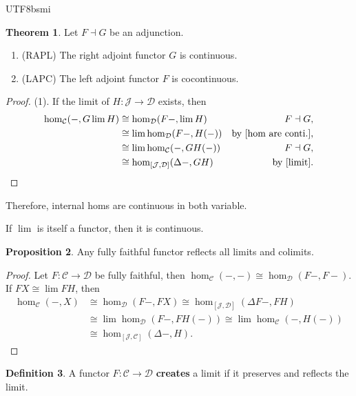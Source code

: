 \documentclass[12pt]{article}
\theoremstyle{definition}
\newtheorem{definition}{Definition}[section]
\newtheorem{theorem}[definition]{Theorem}
\newtheorem{property}[definition]{Proposition}
\newcommand\<{\langle}
\renewcommand\>{\rangle}
\begin{document}
\begin{CJK}{UTF8}{bsmi}
\begin{theorem}
    Let $F\dashv G$ be an adjunction.
    \begin{enumerate}
        \item (RAPL) The right adjoint functor $G$ is continuous.
        \item (LAPC) The left adjoint functor $F$ is cocontinuous.
    \end{enumerate}
\end{theorem}
\begin{proof}
    (1).
    If the limit of $H:\mathcal{J}\to\mathcal{D}$ exists, then
    \begin{align*}
        \hom_\mathcal{C}(-, G\lim H) 
        & \cong \hom_\mathcal{D}(F-, \lim H) & F\dashv G, \\
        & \cong \lim\hom_\mathcal{D}(F-, H(-)) & \text{by } \ref{hom are conti.}, \\
        & \cong \lim\hom_\mathcal{C}(-, GH(-)) & F\dashv G, \\
        & \cong \hom_{[\mathcal{J}, \mathcal{D}]}(\Delta -, GH) & \text{by } \ref{limit}.
    \end{align*}
\end{proof}

Therefore, internal homs are continuous in both variable.

If $\lim$ is itself a functor, then it is continuous.

\begin{property}
    Any fully faithful functor reflects all limits and colimits.
\end{property}
\begin{proof}
    Let $F:\mathcal{C}\to\mathcal{D}$ be fully faithful, then $\hom_\mathcal{C}(-, -)\cong\hom_\mathcal{D}(F-, F-)$.
    If $FX\cong\lim FH$, then
    \begin{align*}
        \hom_\mathcal{C}(-, X) 
        & \cong \hom_\mathcal{D}(F-, FX) 
          \cong \hom_{[\mathcal{J}, \mathcal{D}]}(\Delta F-, FH) \\
        & \cong \lim\hom_\mathcal{D}(F-, FH(-)) 
          \cong \lim\hom_\mathcal{C}(-, H(-)) \\
        & \cong \hom_{[\mathcal{J}, \mathcal{C}]}(\Delta-, H).
    \end{align*}
\end{proof}

\begin{definition}
    A functor $F:\mathcal{C}\to\mathcal{D}$ \textbf{creates} a limit if it preserves and reflects the limit.
\end{definition}


\end{CJK}
\end{document}
